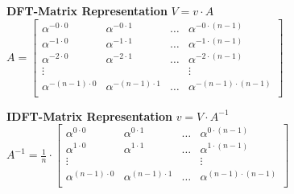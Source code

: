 \begin{minipage}{9cm}
\textbf{DFT-Matrix Representation}
$V=v \cdot A$\\
 $A=\begin{bmatrix} 	
    	\alpha^{-0\cdot 0}		& \alpha^{-0\cdot 1}		& 	\ldots	&\alpha^{-0\cdot (n-1)}	\\
    	\alpha^{-1\cdot 0}		& \alpha^{-1\cdot 1}		& 	\ldots	&\alpha^{-1\cdot (n-1)}	\\
    	\alpha^{-2\cdot 0}		& \alpha^{-2\cdot 1}		&	\ldots	&\alpha^{-2\cdot (n-1)}	\\
    	\vdots					&							&			& \vdots				\\
    	\alpha^{-(n-1)\cdot 0}	& \alpha^{-(n-1)\cdot 1}	&  	\ldots	&\alpha^{-(n-1)\cdot (n-1)}	\\
    \end{bmatrix}$  \\    
\end{minipage}
\begin{minipage}{9cm}
\textbf{IDFT-Matrix Representation}
$v=V \cdot A^{-1}$\\
 $A^{-1}=\frac{1}{n}\cdot \begin{bmatrix} 	
    	\alpha^{0\cdot 0}		& \alpha^{0\cdot 1}		& 	\ldots	&\alpha^{0\cdot (n-1)}	\\
    	\alpha^{1\cdot 0}		& \alpha^{1\cdot 1}		& 	\ldots	&\alpha^{1\cdot (n-1)}	\\
    	\vdots					&						&			& \vdots			\\
    	\alpha^{(n-1)\cdot 0}	& \alpha^{(n-1)\cdot 1}	&	\ldots	&\alpha^{(n-1)\cdot (n-1)}	\\
    \end{bmatrix}$  \\    
\end{minipage}
